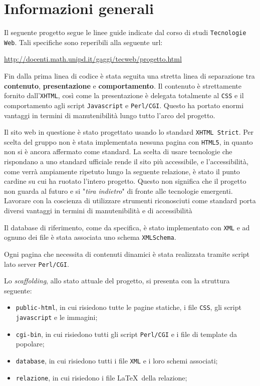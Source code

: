 \section{Informazioni generali}

Il seguente progetto segue le linee guide indicate dal corso di studi \texttt{Tecnologie Web}. Tali specifiche sono reperibili alla seguente url:

\begin{center}
	\url{http://docenti.math.unipd.it/gaggi/tecweb/progetto.html}
\end{center}

Fin dalla prima linea di codice è stata seguita una stretta linea di separazione tra \textbf{contenuto}, \textbf{presentazione} e \textbf{comportamento}. Il contenuto è strettamente fornito dall'\texttt{XHTML}, così come la presentazione è delegata totalmente al \texttt{CSS} e il comportamento agli script \texttt{Javascript} e \texttt{Perl/CGI}. Questo ha portato enormi vantaggi in termini di manutenibilità lungo tutto l'arco del progetto.

Il sito web in questione è stato progettato usando lo standard \texttt{XHTML Strict}. Per scelta del gruppo non è stata implementata nessuna pagina con \texttt{HTML5}, in quanto non si è ancora affermato come standard. La scelta di usare tecnologie che rispondano a uno standard ufficiale rende il sito più accessibile, e l'accessibilità, come verrà ampiamente ripetuto lungo la seguente relazione, è stato il punto cardine su cui ha ruotato l'intero progetto. Questo non significa che il progetto non guarda al futuro e si "\textit{tira indietro}" di fronte alle tecnologie emergenti. Lavorare con la coscienza di utilizzare strumenti riconosciuti come standard porta diversi vantaggi in termini di manutenibilità e di accessibilità

Il database di riferimento, come da specifica, è stato implementato con \texttt{XML} e ad ognuno dei file è stata associata uno schema \texttt{XMLSchema}.

Ogni pagina che necessita di contenuti dinamici è stata realizzata tramite script lato server \texttt{Perl/CGI}.

Lo \textit{scaffolding}, allo stato attuale del progetto, si presenta con la struttura seguente:

\begin{itemize}

	\item \texttt{public-html}, in cui risiedono tutte le pagine statiche, i file \texttt{CSS}, gli script \texttt{javascript} e le immagini;
	\item \texttt{cgi-bin}, in cui risiedono tutti gli script \texttt{Perl/CGI} e i file di template da popolare;
	\item \texttt{database}, in cui risiedono tutti i file \texttt{XML} e i loro schemi associati;
	\item \texttt{relazione}, in cui risiedono i file \LaTeX\ della relazione;

\end{itemize}

